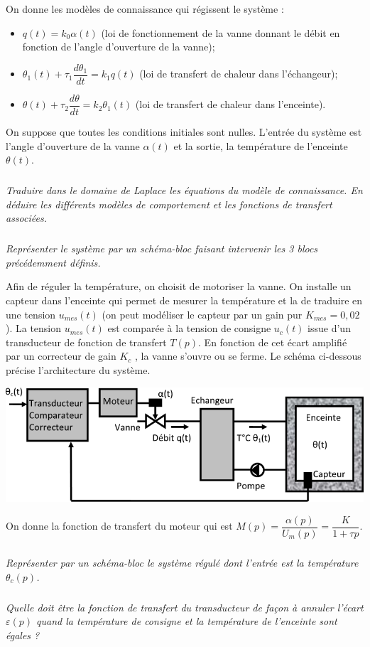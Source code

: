 \documentclass[10pt]{article}
\begin{document}
On donne les modèles de connaissance qui régissent le système : 
\begin{itemize}
\item $q(t)=k_0 \alpha(t)$ (loi de fonctionnement de la vanne donnant le débit en fonction de l’angle d’ouverture de la vanne);
\item $\theta_1(t) + \tau_1 \dfrac{d\theta_1}{dt} = k_1 q(t)$ (loi de transfert de chaleur dans l’échangeur);
\item  $\theta(t) + \tau_2 \dfrac{d\theta}{dt} = k_2 \theta_1(t)$ (loi de transfert de chaleur dans l’enceinte).  
\end{itemize}

On suppose que toutes les conditions initiales sont nulles. L’entrée du système est l’angle d’ouverture de la vanne $\alpha(t)$ et la sortie, la température de l’enceinte $\theta(t)$. 

\subparagraph{}
\textit{Traduire dans le domaine de Laplace les équations du modèle de connaissance. En déduire les différents modèles de comportement et les fonctions de transfert associées.}

\subparagraph{}
\textit{Représenter le système par un schéma-bloc faisant intervenir les 3 blocs précédemment définis.}


Afin de réguler la température, on choisit de motoriser la vanne. On installe un capteur dans l’enceinte qui permet de mesurer la température et la de traduire en une tension $u_{mes} (t)$ (on peut modéliser le capteur par un gain pur $K_{mes} =0,02$). La tension $u_{mes} (t)$ est comparée à la tension de consigne $u_c(t)$ issue d’un transducteur de fonction de transfert $T(p)$. En fonction de cet écart amplifié par un correcteur de gain $K_c$ , la vanne s’ouvre ou se ferme. Le schéma ci-dessous précise l’architecture du système. 

\begin{center}
\includegraphics[width=.6\textwidth]{images/img2}
\end{center}

On donne la fonction de transfert du moteur qui est $M(p)=\dfrac{\alpha(p)}{U_m(p)}=\dfrac{K}{1+\tau p}$.

\subparagraph{}
\textit{Représenter par un schéma-bloc le système régulé dont l’entrée est la température $\theta_c (p)$. }


\subparagraph{}
\textit{Quelle doit être la fonction de transfert du transducteur de façon à annuler l’écart $\varepsilon(p)$ quand la  température de consigne et la température de l’enceinte sont égales ? }
\end{document}
